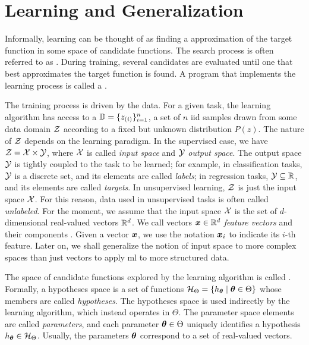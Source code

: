 \section{Learning and Generalization}\label{sec:learning}
Informally, learning can be thought of as finding a  approximation of the target function in some space of candidate functions. The search process is often referred to as . During training, several candidates are evaluated until one that best approximates the target function is found. A program that implements the learning process is called a .

The training process is driven by the data. For a given task, the learning algorithm has access to a  $\mathbb{D} = \{z_{(i)}\}_{i=1}^n$, a set of $n$ \gls{iid} samples drawn from some data domain $\Cal{Z}$ according to a fixed but unknown distribution $P(z)$. The nature of $\Cal{Z}$ depends on the learning paradigm. In the supervised case, we have $\Cal{Z} = \Cal{X} \times \Cal{Y}$, where $\Cal{X}$ is called \emph{input space} and $\Cal{Y}$ \emph{output space}. The output space $\Cal{Y}$ is tightly coupled to the task to be learned; for example, in classification tasks, $\Cal{Y}$ is a discrete set, and its elements are called \emph{labels}; in regression tasks, $\Cal{Y} \subseteq \Real$, and its elements are called \emph{targets}. In unsupervised learning, $\Cal{Z}$ is just the input space $\Cal{X}$. For this reason, data used in unsupervised tasks is often called \emph{unlabeled}. For the moment, we assume that the input space $\Cal{X}$ is the set of $d$-dimensional real-valued vectors $\mathbb{R}^d$. We call vectors $\Vector{x} \in \Real^d$  \emph{feature vectors} and their components . Given a vector $\Vector{x}$, we use the notation $\Feature{x}{i}$ to indicate its $i$-th feature. Later on, we shall generalize the notion of input space to more complex spaces than just vectors to apply \gls{ml} to more structured data.

The space of candidate functions explored by the learning algorithm is called . Formally, a hypotheses space is a set of functions $\HSpace = \Set{h_{\Param} \mid \Param \in \Theta}$ whose members are called \emph{hypotheses}. The hypotheses space is used indirectly by the learning algorithm, which instead operates in  $\Theta$. The parameter space elements are called \emph{parameters}, and each parameter $\boldsymbol{\theta} \in \Theta$ uniquely identifies a hypothesis $h_{\Param} \in \HSpace$. Usually, the parameters $\boldsymbol{\theta}$ correspond to a set of real-valued vectors.

